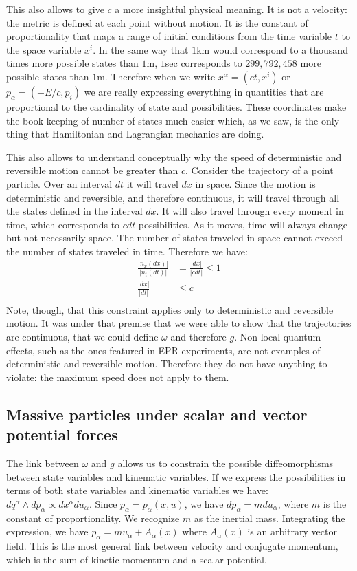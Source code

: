 \documentclass[aps,pra,10pt,twocolumn,floatfix,nofootinbib]{revtex4-1}
\numberwithin{equation}{section}
\theoremstyle{definition}
\begin{document}
This also allows to give $c$ a more insightful physical meaning. It is not a velocity: the metric is defined at each point without motion. It is the constant of proportionality that maps a range of initial conditions from the time variable $t$ to the space variable $x^i$. In the same way that $1$km would correspond to a thousand times more possible states than $1$m, $1$sec corresponds to $299,792,458$ more possible states than $1$m. Therefore when we write $x^\alpha = (ct, x^i)$ or $p_\alpha = (- E/c, p_i)$ we are really expressing everything in quantities that are proportional to the cardinality of state and possibilities. These coordinates make the book keeping of number of states much easier which, as we saw, is the only thing that Hamiltonian and Lagrangian mechanics are doing.

This also allows to understand conceptually why the speed of deterministic and reversible motion cannot be greater than $c$. Consider the trajectory of a point particle. Over an interval $dt$ it will travel $dx$ in space. Since the motion is deterministic and reversible, and therefore continuous, it will travel through all the states defined in the interval $dx$. It will also travel through every moment in time, which corresponds to $cdt$ possibilities. As it moves, time will always change but not necessarily space. The number of states traveled in space cannot exceed the number of states traveled in time. Therefore we have:
\begin{align*}
\frac{|n_x(dx)|}{|n_t(dt)|} &=  \frac{|dx|}{|c dt|} \leq 1 \\
\frac{|dx|}{|dt|} & \leq c \\
\end{align*}
Note, though, that this constraint applies only to deterministic and reversible motion. It was under that premise that we were able to show that the trajectories are continuous, that we could define $\omega$ and therefore $g$. Non-local quantum effects, such as the ones featured in EPR experiments, are not examples of deterministic and reversible motion. Therefore they do not have anything to violate: the maximum speed does not apply to them.

\subsection{Massive particles under scalar and vector potential forces}

The link between $\omega$ and $g$ allows us to constrain the possible diffeomorphisms between state variables and kinematic variables. If we express the possibilities in terms of both state variables and kinematic variables we have: $dq^\alpha \wedge dp_\alpha \propto dx^\alpha du_\alpha$. Since  $p_\alpha=p_\alpha(x, u)$, we have $dp_\alpha = m du_\alpha$, where $m$ is the constant of proportionality. We recognize $m$ as the inertial mass. Integrating the expression, we have $p_\alpha = m u_\alpha + A_\alpha(x)$ where $A_\alpha(x)$ is an arbitrary vector field. This is the most general link between velocity and conjugate momentum, which is the sum of kinetic momentum and a scalar potential.
\end{document}
